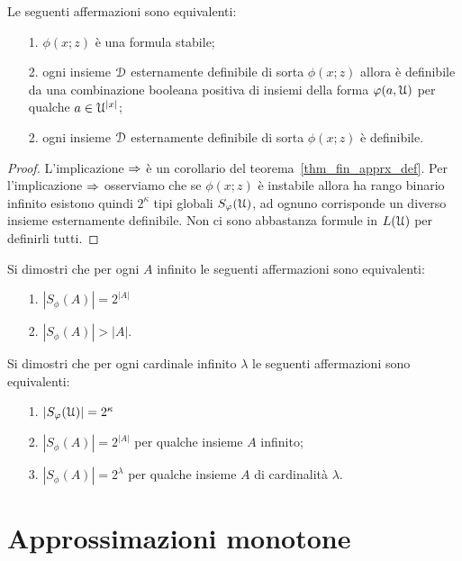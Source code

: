 \begin{corollary}
Le seguenti affermazioni sono equivalenti:
\begin{itemize}
\item[1.] $\phi(x;z)$ \`e una formula stabile;
\item[2.] ogni insieme $\EuScript D$ esternamente definibile di sorta $\phi(x;z)$ allora \`e definibile da una combinazione booleana positiva di insiemi della forma $\varphi(a,\EuScript U)$ per qualche $a\in\EuScript U^{|x|}$;
\item[2.] ogni insieme $\EuScript D$ esternamente definibile di sorta $\phi(x;z)$ \`e definibile.
\end{itemize}
\end{corollary}
\begin{proof}
L'implicazione $\Rightarrow$ \`e un corollario del teorema~\ref{thm_fin_apprx_def}. Per l'implicazione $\Rightarrow$ osserviamo che se $\phi(x;z)$ \`e instabile allora ha rango binario infinito esistono quindi $2^\kappa$ tipi globali $S_\varphi(\EuScript U)$, ad ognuno corrisponde un diverso insieme esternamente definibile. Non ci sono abbastanza formule in $L(\EuScript U)$ per definirli tutti.
\end{proof}

\begin{exercise}
Si dimostri che per ogni $A$ infinito le seguenti affermazioni sono equivalenti:
\begin{itemize}
\item[1.] $|S_\phi(A)|=2^{|A|}$
\item[2.] $|S_\phi(A)|>|A|$.\QED
\end{itemize}
\end{exercise}


\begin{exercise}
Si dimostri che per ogni cardinale infinito $\lambda$ le seguenti affermazioni sono equivalenti:
\begin{itemize}
\item[1.] $|S_\varphi(\EuScript U)|=2^\kappa$
\item[2.] $|S_\phi(A)|=2^{|A|}$ per qualche insieme $A$ infinito;
\item[3.] $|S_\phi(A)|=2^{\lambda}$ per qualche insieme $A$ di cardinalit\`a $\lambda$.\QED
\end{itemize}
\end{exercise}

\section{Approssimazioni monotone}\label{approxmonotone}
\def\i{{\rm i}}

